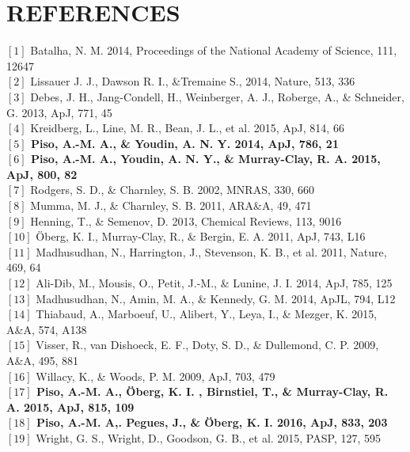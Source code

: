\documentclass[12pt, letterpaper]{article}
\begin{document}
\section{REFERENCES}
\singlespacing
\noindent $[1]$ Batalha, N. M. 2014, Proceedings of the National Academy of Science, 111, 12647 \\
$[2]$ Lissauer J. J., Dawson R. I., \&Tremaine S., 2014, Nature, 513, 336 \\
$[3]$ Debes, J. H., Jang-Condell, H., Weinberger, A. J., Roberge, A., \& Schneider, G. 2013, ApJ, 771, 45 \\
$[4]$ Kreidberg, L., Line, M. R., Bean, J. L., et al. 2015, ApJ, 814, 66 \\
\textbf{$[5]$ Piso, A.-M. A., \& Youdin, A. N. Y. 2014, ApJ, 786, 21} \\
\textbf{$[6]$ Piso, A.-M. A., Youdin, A. N. Y., \& Murray-Clay, R. A. 2015, ApJ, 800, 82} \\
$[7]$ Rodgers, S. D., \& Charnley, S. B. 2002, MNRAS, 330, 660 \\
$[8]$ Mumma, M. J., \& Charnley, S. B. 2011, ARA\&A, 49, 471 \\
$[9]$ Henning, T., \& Semenov, D. 2013, Chemical Reviews, 113, 9016 \\
$[10]$ \"Oberg, K. I., Murray-Clay, R., \& Bergin, E. A. 2011, ApJ, 743, L16 \\
$[11]$ Madhusudhan, N., Harrington, J., Stevenson, K. B., et al. 2011, Nature, 469, 64 \\
$[12]$ Ali-Dib, M., Mousis, O., Petit, J.-M., \& Lunine, J. I. 2014, ApJ, 785, 125 \\
$[13]$ Madhusudhan, N., Amin, M. A., \& Kennedy, G. M. 2014, ApJL, 794, L12 \\
$[14]$ Thiabaud, A., Marboeuf, U., Alibert, Y., Leya, I., \& Mezger, K. 2015, A\&A, 574, A138 \\
$[15]$ Visser, R., van Dishoeck, E. F., Doty, S. D., \& Dullemond, C. P. 2009, A\&A, 495, 881 \\
$[16]$ Willacy, K., \& Woods, P. M. 2009, ApJ, 703, 479 \\
\textbf{$[17]$ Piso, A.-M. A., \"Oberg, K. I. , Birnstiel, T., \& Murray-Clay, R. A. 2015, ApJ, 815, 109} \\
\textbf{$[18]$ Piso, A.-M. A,. Pegues, J., \& \"Oberg, K. I.  2016, ApJ, 833, 203} \\
$[19]$ Wright, G. S., Wright, D., Goodson, G. B., et al. 2015, PASP, 127, 595 \\
\end{document}
